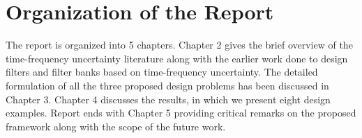 \section{Organization of the Report}
The report is organized into 5 chapters. Chapter 2 gives the brief overview of the time-frequency uncertainty literature along with the earlier work done to design filters and filter banks based on time-frequency uncertainty. The detailed formulation of all the three proposed design problems has been discussed in  Chapter 3. Chapter 4 discusses the results, in which we present eight design examples. Report ends with Chapter 5 providing critical remarks on the proposed framework  along with the scope of the future work.
 